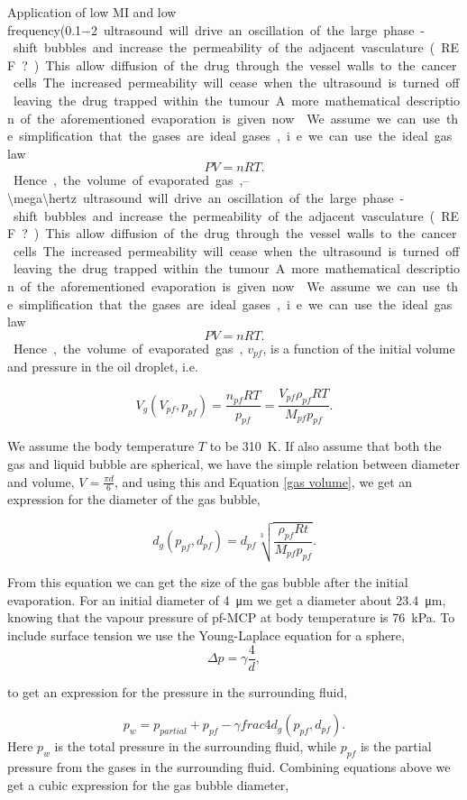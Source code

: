 Application of low MI and low frequency(\SIrange{0.1-2}{\mega\hertz} ultrasound will drive an oscillation of the large phase-shift bubbles and increase the permeability of the adjacent vasculature(REF?). This allow diffusion of the drug through the vessel walls to the cancer cells. The increased permeability will cease when the ultrasound is turned off leaving the drug trapped within the tumour.

A more mathematical description of the aforementioned evaporation is given now\cite{Healey2013}. We assume we can use the simplification that the gases are ideal gases, i.e. we can use the ideal gas law
\begin{equation}
\label{ideal gas law}
 PV = nRT. 
\end{equation}  
Hence, the volume of evaporated gas, $v_{pf}$, is a function of the initial volume and pressure in the oil droplet, i.e.

\begin{equation}
\label{gas volume}
V_g(V_{pf}, p_{pf}) = \frac{n_{pf}RT}{p_{pf}}=\frac{V_{pf}\rho_{pf}RT}{M_{pf}p_{pf}}.
\end{equation}

We assume the body temperature $T$ to be \SI{310}{\kelvin}. If also assume that both the gas and liquid bubble are spherical, we have the simple relation between diameter and volume, $V = \frac{\pi d}{6}$, and using this and Equation \eqref{gas volume}, we get an expression for the diameter of the gas bubble, 

\begin{equation}
\label{diameter}
d_g(p_{pf}, d_{pf}) = d_{pf}\sqrt[3]{\frac{\rho_{pf}Rt}{M_{pf}p_{pf}}}.
\end{equation}

From this equation we can get the size of the gas bubble after the initial evaporation. For an initial diameter of \SI{4}{\micro\metre} we get a diameter about \SI{23.4}{\micro\metre}, knowing that the vapour pressure of pf-MCP at body temperature is \SI{76}{\kilo\pascal}\cite{Healey2013}.
To include surface tension we use the Young-Laplace equation for a sphere,
\begin{equation}
\label{Young-Laplace}
\Delta p = \gamma\frac{4}{d},
\end{equation}

to get an expression for the pressure in the surrounding fluid, 

\begin{equation}
p_w = p_{partial} + p_{pf} - \gamma frac{4}{d_g(p_{pf}, d_{pf})}.
\end{equation}
Here $p_w$ is the total pressure in the surrounding fluid, while $p_{pf}$ is the partial pressure from the gases in the surrounding fluid. Combining equations above we get a cubic expression for the gas bubble diameter,  

